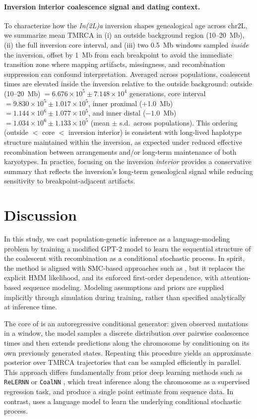 \documentclass[9pt,twocolumn,twoside]{pnas-new}
\begin{document}
\paragraph{Inversion interior coalescence signal and dating context.}
To characterize how the \emph{In(2L)a} inversion shapes genealogical age across chr2L, 
we summarize mean TMRCA in 
(i) an outside background region (10--20~Mb), 
(ii) the full inversion core interval, 
and (iii) two 0.5~Mb windows sampled \emph{inside} the inversion, 
offset by 1~Mb from each breakpoint to avoid the immediate transition zone where mapping artifacts,
missingness, 
and recombination suppression can confound interpretation.
Averaged across populations, coalescent times are elevated inside the inversion relative to the outside background:
outside (10--20~Mb) $= 6.676\times 10^{5} \pm 7.148\times 10^{4}$ generations,
core interval $= 9.830\times 10^{5} \pm 1.017\times 10^{5}$,
inner proximal (+1.0~Mb) $= 1.144\times 10^{6} \pm 1.077\times 10^{5}$,
and inner distal ($-1.0$~Mb) $= 1.034\times 10^{6} \pm 1.133\times 10^{5}$ (mean $\pm$ s.d.\ across populations).
This ordering (outside $<$ core $<$ inversion interior) is consistent with long-lived haplotype structure maintained within the inversion, as expected under reduced effective recombination between arrangements and/or long-term maintenance of both karyotypes.
In practice, focusing on the inversion \emph{interior} provides a conservative summary that reflects the inversion's long-term genealogical signal while reducing sensitivity to breakpoint-adjacent artifacts.

\section*{Discussion}

In this study, we cast population-genetic inference as a language-modeling problem
by training a modified GPT-2 model to learn the sequential structure of the coalescent with recombination
as a conditional stochastic process. 
In spirit, the method is aligned with SMC-based approaches such as \smcpp,
but it replaces the explicit HMM likelihood, and its enforced first-order dependence, with attention-based sequence modeling.
Modeling assumptions and priors are supplied implicitly through simulation during training, rather than specified analytically at inference time.

The core of \cxtkit is an autoregressive conditional generator:
given observed mutations in a window, the model samples a discrete distribution over pairwise coalescence times 
and then extends predictions along the chromosome by conditioning on its own previously generated states.
Repeating this procedure yields an approximate posterior over TMRCA trajectories
that can be sampled efficiently in parallel.
This approach differs fundamentally from prior deep learning methods such as \texttt{ReLERNN} \cite{adrion2020predicting} or \texttt{CoalNN} \cite{nait_saada_inference_2023}, which treat inference along the chromosome as a supervised regression task, and produce a single point estimate from sequence data.
In contrast, \cxtkit uses a language model to learn the underlying conditional stochastic process.
\end{document}

